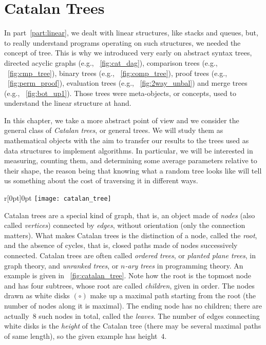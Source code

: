 \chapter{Catalan Trees}
\label{chap:Catalan}

In part~\ref{part:linear}, we dealt with linear structures, like
stacks and queues, but, to really understand programs operating on
such structures, we needed the concept of tree. This is why we
introduced very early on abstract syntax trees, directed acyclic graphs (e.g.,
\fig~\vref{fig:cat_dag}), comparison trees (e.g.,
\fig~\vref{fig:cmp_tree}), binary trees (e.g.,
\fig~\vref{fig:comp_tree}), proof trees (e.g.,
\fig~\vref{fig:perm_proof}), evaluation trees (e.g.,
\fig~\vref{fig:2way_unbal}) and merge trees (e.g.,
\fig~\vref{fig:bot_up1}). Those trees were meta\hyp{}objects, or
concepts, used to understand the linear structure at hand.

In this chapter, we take a more abstract point of view and we consider
the general class of \emph{Catalan trees}, or general trees. We will
study them as mathematical objects with the aim to transfer our
results to the trees used as data structures to implement
algorithms. In particular, we will be interested in measuring,
counting them, and determining some average parameters relative to
their shape, the reason being that knowing what a random tree looks
like will tell us something about the cost of traversing it in
different ways.

%
\begin{wrapfigure}[10]{r}[0pt]{0pt}
\centering
\texttt{[image: catalan\_tree]}
\caption{Catalan tree of height~4}
\label{fig:catalan_tree}
\end{wrapfigure}
Catalan trees are a special kind of graph, that is, an object made of
\emph{nodes} (also called \emph{vertices}) connected by \emph{edges},
without orientation (only the connection matters). What makes Catalan
trees is the distinction of a node, called the \emph{root}, and the
absence of cycles, that is, closed paths made of nodes successively
connected. Catalan trees are often called \emph{ordered trees}, or
\emph{planted plane trees}, in graph theory, and \emph{unranked
  trees}, or \emph{\(n\)-ary trees} in programming theory. An example
is given in \fig~\ref{fig:catalan_tree}. Note how the root is the
topmost node and has four subtrees, whose root are called
\emph{children}, given in order. The nodes drawn as white disks
\((\circ)\) make up a maximal path starting from the root (the number
of nodes along it is maximal). The ending node has no children; there
are actually~\(8\) such nodes in total, called the \emph{leaves}. The
number of edges connecting white disks is the \emph{height} of the
Catalan tree (there may be several maximal paths of same length), so
the given example has height~\(4\).

